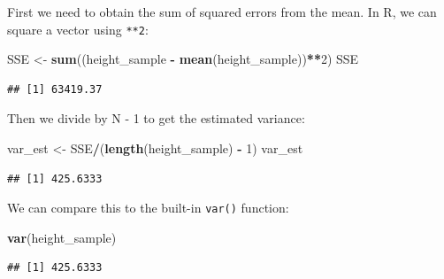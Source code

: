 \documentclass[12pt,]{book}
\newenvironment{Shaded}{\begin{snugshade}}{\end{snugshade}}
\newcommand{\DecValTok}[1]{\textcolor[rgb]{0.00,0.00,0.81}{#1}}
\newcommand{\KeywordTok}[1]{\textcolor[rgb]{0.13,0.29,0.53}{\textbf{#1}}}
\newcommand{\NormalTok}[1]{#1}
\newcommand{\OperatorTok}[1]{\textcolor[rgb]{0.81,0.36,0.00}{\textbf{#1}}}
\newcommand{\StringTok}[1]{\textcolor[rgb]{0.31,0.60,0.02}{#1}}
\begin{document}
\begin{Shaded}
\end{Shaded}

First we need to obtain the sum of squared errors from the mean. In R, we can square a vector using \texttt{**2}:

\begin{Shaded}
\begin{Highlighting}[]
\NormalTok{SSE <-}\StringTok{ }\KeywordTok{sum}\NormalTok{((height_sample }\OperatorTok{-}\StringTok{ }\KeywordTok{mean}\NormalTok{(height_sample))}\OperatorTok{**}\DecValTok{2}\NormalTok{)}
\NormalTok{SSE}
\end{Highlighting}
\end{Shaded}

\begin{verbatim}
## [1] 63419.37
\end{verbatim}

Then we divide by N - 1 to get the estimated variance:

\begin{Shaded}
\begin{Highlighting}[]
\NormalTok{var_est <-}\StringTok{ }\NormalTok{SSE}\OperatorTok{/}\NormalTok{(}\KeywordTok{length}\NormalTok{(height_sample) }\OperatorTok{-}\StringTok{ }\DecValTok{1}\NormalTok{)}
\NormalTok{var_est}
\end{Highlighting}
\end{Shaded}

\begin{verbatim}
## [1] 425.6333
\end{verbatim}

We can compare this to the built-in \texttt{var()} function:

\begin{Shaded}
\begin{Highlighting}[]
\KeywordTok{var}\NormalTok{(height_sample)}
\end{Highlighting}
\end{Shaded}

\begin{verbatim}
## [1] 425.6333
\end{verbatim}
\end{document}
